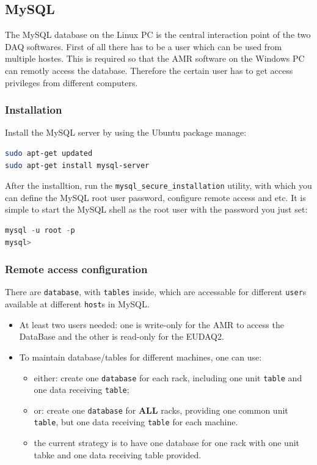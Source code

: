 \documentclass[a4paper,12pt]{scrartcl}
\begin{document}
\subsection{MySQL}
The MySQL database on the Linux PC is the central interaction point of the two DAQ softwares. First of all there has to be a user which can be used from multiple hostes. This is required so that the AMR software on the Windows PC can remotly access the database. Therefore the certain user has to get access privileges from different computers.

\subsubsection*{Installation}

Install the MySQL server by using the Ubuntu package manage:
\begin{lstlisting}[language=bash]
sudo apt-get updated
sudo apt-get install mysql-server
\end{lstlisting}

After the installtion, run the \verb|mysql_secure_installation| utility, with which you can define the MySQL root user password, configure remote access and etc.
It is simple to start the MySQL shell as the root user with the password you just set:
\begin{lstlisting}[language=SQL]
mysql -u root -p
mysql>
\end{lstlisting}

\subsubsection*{Remote access configuration}
There are \texttt{database}, with \texttt{tables} inside, which are accessable for different \texttt{user}s available at different \texttt{host}s in MySQL.
\begin{itemize}
  \item At least two users needed: one is write-only for the AMR to access the DataBase and the other is read-only for the EUDAQ2.
  \item To maintain database/tables for different machines, one can use:
  \begin{itemize}
    \item either: create one \texttt{database} for each rack, including one unit \texttt{table} and one data receiving \texttt{table};
    \item or: create one \texttt{database} for \textbf{ALL} racks, providing one common unit \texttt{table}, but one data receiving \texttt{table} for each machine.
    \item the current strategy is to have one database for one rack with one unit tabke and one data receiving table provided.
  \end{itemize}
\end{itemize}
\end{document}
